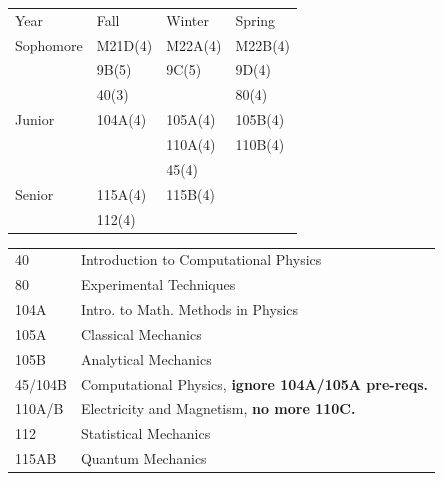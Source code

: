 \documentclass[12pt]{article}
\begin{document}
\begin{center}
\begin{tabular}{|l|l|l|l|}
\hline
Year      & Fall    & Winter & Spring \\
Sophomore & M21D(4)  & M22A(4)  & M22B(4)\\ 
          & 9B(5)    & 9C(5)    & 9D(4) \\
          & 40(3)    &          & 80(4) \\
\hline 
Junior   & 104A(4)   & 105A(4) & 105B(4) \\
         &           & 110A(4) & 110B(4) \\         
         &           & 45(4)   & \\
\hline
Senior   & 115A(4)    & 115B(4)     & \\
         & 112(4)   &               &  \\
\hline
\end{tabular}
\end{center}


\begin{center}
\begin{tabular}{|l|l|}
\hline
40 & Introduction to Computational Physics \\ 
80 & Experimental Techniques \\
104A & Intro. to Math. Methods in Physics \\
105A & Classical Mechanics \\
105B & Analytical Mechanics \\
45/104B & Computational Physics, {\bf ignore 104A/105A pre-reqs.} \\
110A/B & Electricity and Magnetism, \bf no more 110C. \\
112 & Statistical Mechanics \\
115AB & Quantum Mechanics \\
\hline
\end{tabular}
\end{center}

\newpage
\end{document}
